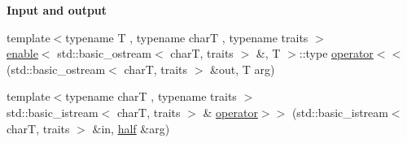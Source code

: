 \begin{Indent}\textbf{ Input and output}\par
\begin{DoxyCompactItemize}
\item 
{\footnotesize template$<$typename T , typename charT , typename traits $>$ }\\\hyperlink{structhalf__float_1_1detail_1_1enable}{enable}$<$ std\+::basic\+\_\+ostream$<$ charT, traits $>$ \&, T $>$\+::type \hyperlink{namespacehalf__float_1_1detail_a91f6492ee3c6586e6d9dcdfcb31bccca}{operator$<$$<$} (std\+::basic\+\_\+ostream$<$ charT, traits $>$ \&out, T arg)
\item 
{\footnotesize template$<$typename charT , typename traits $>$ }\\std\+::basic\+\_\+istream$<$ charT, traits $>$ \& \hyperlink{namespacehalf__float_1_1detail_a50bcccb2f7042c23766a4f39090ed709}{operator$>$$>$} (std\+::basic\+\_\+istream$<$ charT, traits $>$ \&in, \hyperlink{classhalf__float_1_1half}{half} \&arg)
\end{DoxyCompactItemize}
\end{Indent}
